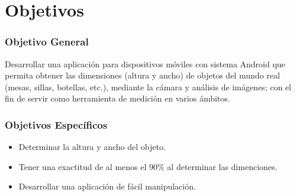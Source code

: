 \section{Objetivos}
\subsubsection{Objetivo General}

Desarrollar una aplicación para dispositivos móviles con sistema Android que permita obtener las dimensiones (altura y ancho) de objetos del mundo real (mesas, sillas, botellas, etc.), mediante la cámara y análisis de imágenes; con el fin de servir como herramienta de medición en varios ámbitos.

\subsubsection{Objetivos Específicos}
\begin{itemize}
	\item Determinar la altura y ancho del objeto.
	\item Tener una exactitud de al menos el 90\% al determinar las dimenciones.
	\item Desarrollar una aplicación de fácil manipulación.
\end{itemize}